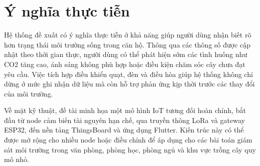 \section{Ý nghĩa thực tiễn}
Hệ thống đề xuất có ý nghĩa thực tiễn ở khả năng giúp người dùng nhận biết rõ hơn trạng thái môi trường sống trong căn hộ. Thông qua các thông số được cập nhật theo thời gian thực, người dùng có thể phát hiện sớm các tình huống như CO2 tăng cao, ánh sáng không phù hợp hoặc điều kiện chăm sóc cây chưa đạt yêu cầu. Việc tích hợp điều khiển quạt, đèn và điều hòa giúp hệ thống không chỉ dừng ở mức ghi nhận dữ liệu mà còn hỗ trợ phản ứng kịp thời trước các thay đổi của môi trường.

Về mặt kỹ thuật, đề tài minh họa một mô hình IoT tương đối hoàn chỉnh, bắt đầu từ node cảm biến tài nguyên hạn chế, qua truyền thông LoRa và gateway ESP32, đến nền tảng ThingsBoard và ứng dụng Flutter. Kiến trúc này có thể được mở rộng cho nhiều node hoặc điều chỉnh để áp dụng cho các bài toán giám sát môi trường trong văn phòng, phòng học, phòng ngủ và khu vực trồng cây quy mô nhỏ.
